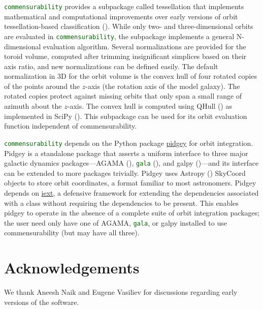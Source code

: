 \documentclass[12pt]{article}
\let\oldtexttt\texttt
\renewcommand{\texttt}[1]{\oldtexttt{\textcolor{darkgreen}{#1}}}
\begin{document}
\texttt{commensurability} provides a subpackage called tessellation that
implements mathematical and computational improvements over early
versions of orbit tessellation-based classification
().
While only two- and three-dimensional orbits are evaluated in
\texttt{commensurability}, the subpackage implements a general
N-dimensional evaluation algorithm. Several normalizations are provided
for the toroid volume, computed after trimming insignificant simplices
based on their axis ratio, and new normalizations can be defined easily.
The default normalization in 3D for the orbit volume is the convex hull
of four rotated copies of the points around the \(z\)-axis (the rotation
axis of the model galaxy). The rotated copies protect against missing
orbits that only span a small range of azimuth about the \(z\)-axis. The
convex hull is computed using QHull () as implemented in SciPy
(). This subpackage can
be used for its orbit evaluation function independent of
commensurability.

\texttt{commensurability} depends on the Python package
\href{https://github.com/ilikecubesnstuff/pidgey}{pidgey} for orbit
integration. Pidgey is a standalone package that asserts a uniform
interface to three major galactic dynamics packages---AGAMA
(), \texttt{gala}
(), and galpy
()---and its interface can be
extended to more packages trivially. Pidgey uses Astropy
()
SkyCoord objects to store orbit coordinates, a format familiar to most
astronomers. Pidgey depends on
\href{https://github.com/ilikecubesnstuff/iext}{iext}, a defensive
framework for extending the dependencies associated with a class without
requiring the dependencies to be present. This enables pidgey to operate
in the absence of a complete suite of orbit integration packages; the
user need only have one of AGAMA, \texttt{gala}, or galpy installed to
use commensurability (but may have all three).

\section{Acknowledgements}\label{acknowledgements}

We thank Aneesh Naik and Eugene Vasiliev for discussions regarding early
versions of the software.
\end{document}
